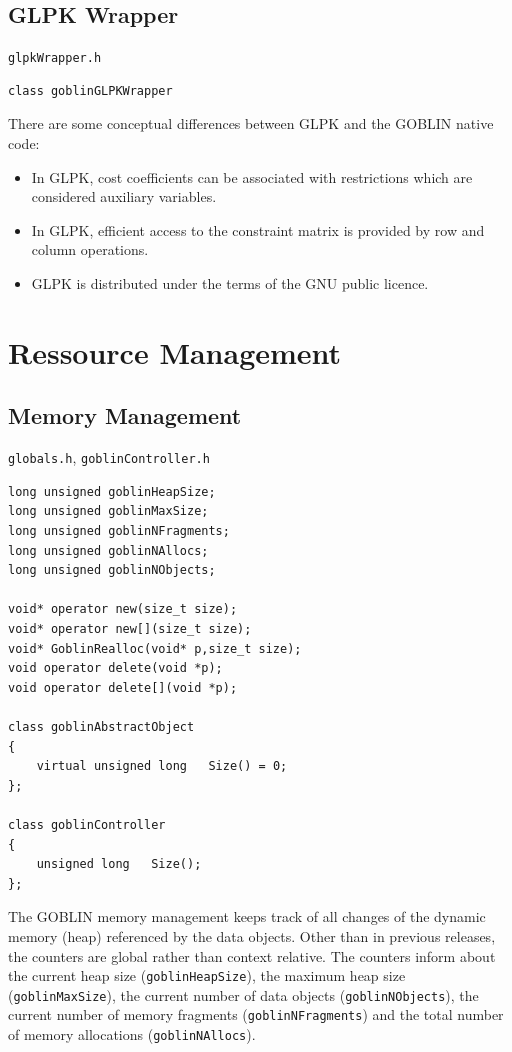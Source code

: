 \documentclass[a4paper,11pt,twoside]{book}
\begin{document}
\begin{multicols}{2}
\section{GLPK Wrapper}
\myinclude\verb/glpkWrapper.h/
\begin{mymethods}
\begin{verbatim}
class goblinGLPKWrapper
\end{verbatim}
\end{mymethods}
There are some conceptual differences between GLPK and the GOBLIN native code:
\begin{itemize}
\item In GLPK, cost coefficients can be associated with restrictions which are
    considered auxiliary variables.
\item In GLPK, efficient access to the constraint matrix is provided by row and
    column operations.
\item GLPK is distributed under the terms of the GNU public licence.
\end{itemize}



\cleardoublepage
{}
\thispagestyle{fancy}
\chapter{Ressource Management}

\section{Memory Management}
\label{slb530}
\myincludes\verb/globals.h/, \verb/goblinController.h/
\begin{mymethods}
\begin{verbatim}
long unsigned goblinHeapSize;
long unsigned goblinMaxSize;
long unsigned goblinNFragments;
long unsigned goblinNAllocs;
long unsigned goblinNObjects;

void* operator new(size_t size);
void* operator new[](size_t size);
void* GoblinRealloc(void* p,size_t size);
void operator delete(void *p);
void operator delete[](void *p);

class goblinAbstractObject
{
    virtual unsigned long   Size() = 0;
};

class goblinController
{
    unsigned long   Size();
};
\end{verbatim}
\end{mymethods}
The GOBLIN memory management keeps track of all changes of the dynamic memory
(heap) referenced by the data objects. Other than in previous releases, the
counters are global rather than context relative. The counters inform about the
current heap size (\verb/goblinHeapSize/), the maximum heap size
(\verb/goblinMaxSize/), the current number of data objects
(\verb/goblinNObjects/), the current number of memory fragments
(\verb/goblinNFragments/) and the total number of memory allocations
(\verb/goblinNAllocs/).


\end{multicols}
\end{document}
